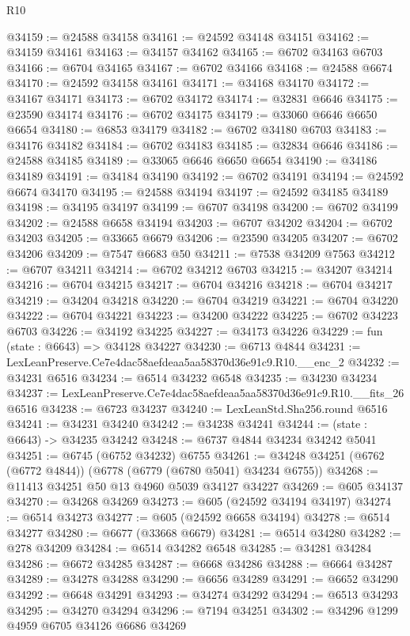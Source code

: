 \begin{lexlean}{R10}
\begin{coremodule}
@34159 := @24588 @34158
@34161 := @24592 @34148 @34151
@34162 := @34159 @34161
@34163 := @34157 @34162
@34165 := @6702 @34163 @6703
@34166 := @6704 @34165
@34167 := @6702 @34166
@34168 := @24588 @6674
@34170 := @24592 @34158 @34161
@34171 := @34168 @34170
@34172 := @34167 @34171
@34173 := @6702 @34172
@34174 := @32831 @6646
@34175 := @23590 @34174
@34176 := @6702 @34175
@34179 := @33060 @6646 @6650 @6654
@34180 := @6853 @34179
@34182 := @6702 @34180 @6703
@34183 := @34176 @34182
@34184 := @6702 @34183
@34185 := @32834 @6646
@34186 := @24588 @34185
@34189 := @33065 @6646 @6650 @6654
@34190 := @34186 @34189
@34191 := @34184 @34190
@34192 := @6702 @34191
@34194 := @24592 @6674 @34170
@34195 := @24588 @34194
@34197 := @24592 @34185 @34189
@34198 := @34195 @34197
@34199 := @6707 @34198
@34200 := @6702 @34199
@34202 := @24588 @6658 @34194
@34203 := @6707 @34202
@34204 := @6702 @34203
@34205 := @33665 @6679
@34206 := @23590 @34205
@34207 := @6702 @34206
@34209 := @7547 @6683 @50
@34211 := @7538 @34209 @7563
@34212 := @6707 @34211
@34214 := @6702 @34212 @6703
@34215 := @34207 @34214
@34216 := @6704 @34215
@34217 := @6704 @34216
@34218 := @6704 @34217
@34219 := @34204 @34218
@34220 := @6704 @34219
@34221 := @6704 @34220
@34222 := @6704 @34221
@34223 := @34200 @34222
@34225 := @6702 @34223 @6703
@34226 := @34192 @34225
@34227 := @34173 @34226
@34229 := fun (state : @6643) => @34128 @34227
@34230 := @6713 @4844
@34231 := LexLeanPreserve.Ce7e4dac58aefdeaa5aa58370d36e91c9.R10.__enc_2
@34232 := @34231 @6516
@34234 := @6514 @34232 @6548
@34235 := @34230 @34234
@34237 := LexLeanPreserve.Ce7e4dac58aefdeaa5aa58370d36e91c9.R10.__fits_26 @6516
@34238 := @6723 @34237
@34240 := LexLeanStd.Sha256.round @6516
@34241 := @34231 @34240
@34242 := @34238 @34241
@34244 := (state : @6643) -> @34235 @34242
@34248 := @6737 @4844 @34234 @34242 @5041
@34251 := @6745 (@6752 @34232) @6755
@34261 := @34248 @34251 (@6762 (@6772 @4844)) (@6778 (@6779 (@6780 @5041) @34234 @6755))
@34268 := @11413 @34251 @50 @13 @4960 @5039 @34127 @34227
@34269 := @605 @34137
@34270 := @34268 @34269
@34273 := @605 (@24592 @34194 @34197)
@34274 := @6514 @34273
@34277 := @605 (@24592 @6658 @34194)
@34278 := @6514 @34277
@34280 := @6677 (@33668 @6679)
@34281 := @6514 @34280
@34282 := @278 @34209
@34284 := @6514 @34282 @6548
@34285 := @34281 @34284
@34286 := @6672 @34285
@34287 := @6668 @34286
@34288 := @6664 @34287
@34289 := @34278 @34288
@34290 := @6656 @34289
@34291 := @6652 @34290
@34292 := @6648 @34291
@34293 := @34274 @34292
@34294 := @6513 @34293
@34295 := @34270 @34294
@34296 := @7194 @34251
@34302 := @34296 @1299 @4959 @6705 @34126 @6686 @34269

\end{coremodule}
\end{lexlean}
